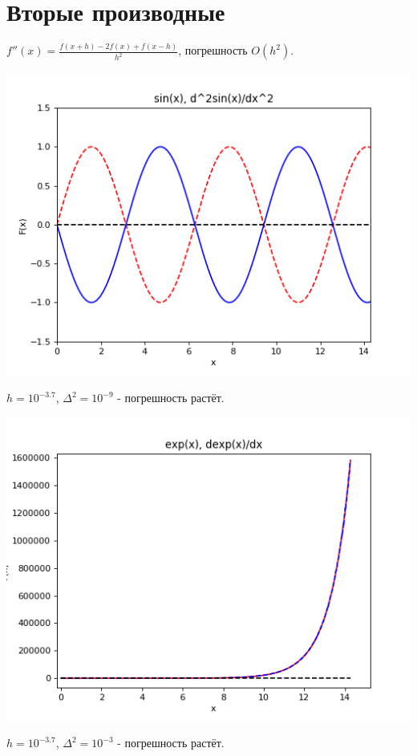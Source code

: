 \documentclass[12pt,a4paper]{scrartcl}
\begin{document}
	\section{Вторые производные}
		$f''(x) = \frac{f(x+h) - 2f(x) + f(x-h)}{h^2}$, погрешность $O(h^2)$.
		\begin{center}
			\includegraphics[scale=0.74]{figure_7} \\
		\end{center}
		$h = 10^{-3.7}$, $\Delta^2 = 10^{-9}$ - погрешность растёт.
		\begin{center}
			\includegraphics[scale=0.73]{figure_8} \\
		\end{center}
		$h = 10^{-3.7}$, $\Delta^2 = 10^{-3}$ - погрешность растёт.
\end{document}
